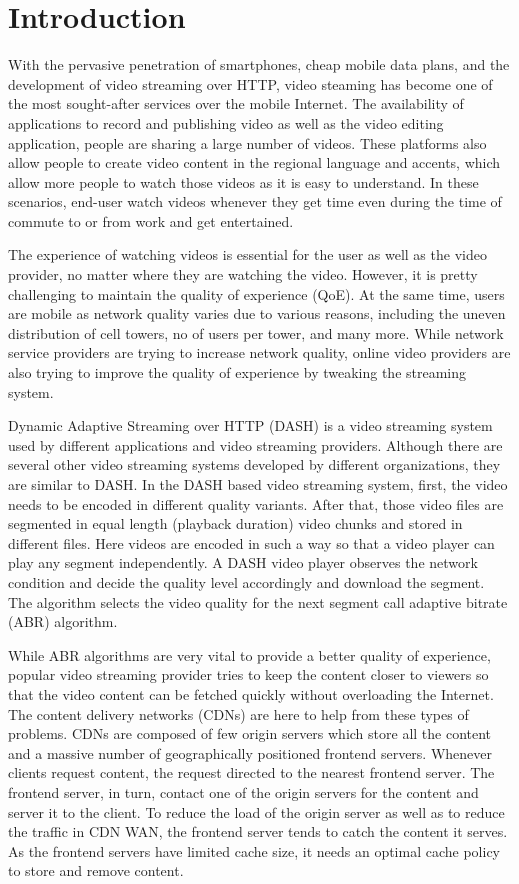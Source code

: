 \section{Introduction}
With the pervasive penetration of smartphones, cheap mobile data plans, and the development of video streaming over HTTP, video steaming has become one of the most sought-after services over the mobile Internet. The availability of applications to record and publishing video as well as the video editing application, people are sharing a large number of videos. These platforms also allow people to create video content in the regional language and accents, which allow more people to watch those videos as it is easy to understand. In these scenarios, end-user watch videos whenever they get time even during the time of commute to or from work and get entertained.

The experience of watching videos is essential for the user as well as the video provider, no matter where they are watching the video. However, it is pretty challenging to maintain the quality of experience (QoE). At the same time, users are mobile as network quality varies due to various reasons, including the uneven distribution of cell towers, no of users per tower, and many more. While network service providers are trying to increase network quality, online video providers are also trying to improve the quality of experience by tweaking the streaming system.

Dynamic Adaptive Streaming over HTTP (DASH) is a video streaming system used by different applications and video streaming providers. Although there are several other video streaming systems developed by different organizations, they are similar to DASH. In the DASH based video streaming system, first, the video needs to be encoded in different quality variants. After that, those video files are segmented in equal length (playback duration) video chunks and stored in different files. Here videos are encoded in such a way so that a video player can play any segment independently. A DASH video player observes the network condition and decide the quality level accordingly and download the segment. The algorithm selects the video quality for the next segment call adaptive bitrate (ABR) algorithm.

While ABR algorithms are very vital to provide a better quality of experience, popular video streaming provider tries to keep the content closer to viewers so that the video content can be fetched quickly without overloading the Internet. The content delivery networks (CDNs) are here to help from these types of problems. CDNs are composed of few origin servers which store all the content and a massive number of geographically positioned frontend servers. Whenever clients request content, the request directed to the nearest frontend server. The frontend server, in turn, contact one of the origin servers for the content and server it to the client. To reduce the load of the origin server as well as to reduce the traffic in CDN WAN, the frontend server tends to catch the content it serves. As the frontend servers have limited cache size, it needs an optimal cache policy to store and remove content.

